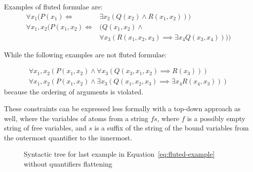
Examples of fluted formulae are:
\begin{equation}\label{eq:fluted-example}
  \begin{aligned}
    \forall x_1 (P(x_1) \iff &\exists x_2(Q(x_2) \land R(x_1, x_2)))\\
    \forall x_1,x_2 (P(x_1,x_2) \iff &  (Q(x_1,x_2) \land\\
                                     &  \forall x_3 (R(x_1,x_2,x_3) \implies \exists x_4 Q(x_3,x_4))))
  \end{aligned}
\end{equation}

While the following examples are not fluted formulae:

\begin{equation}\label{eq:not-fluted-example}
  \begin{aligned}
    \forall x_1,x_2(P(x_1,x_2) \land \forall x_3(Q(x_3,x_1,x_2) \implies R(x_3)))\\
    \forall x_1,x_2(P(x_1,x_2) \land \exists x_3(Q(x_1,x_2,x_3) \implies \exists x_4 R(x_4,x_3)))
  \end{aligned}
\end{equation}
\indent because the ordering of arguments is violated.

\noindent These constraints can be expressed less formally with a top-down approach as well, where the variables of atoms from a string \(fs\), where \(f\) is a possibly empty string of free variables, and \(s\) is a suffix of the string of the bound variables from the outermost quantifier to the innermost.

\begin{figure}[H]
    \centering
    \caption{Syntactic tree for last example in Equation~\ref{eq:fluted-example} without quantifiers flattening}\label{fig:fluted_syntree}
\end{figure}

